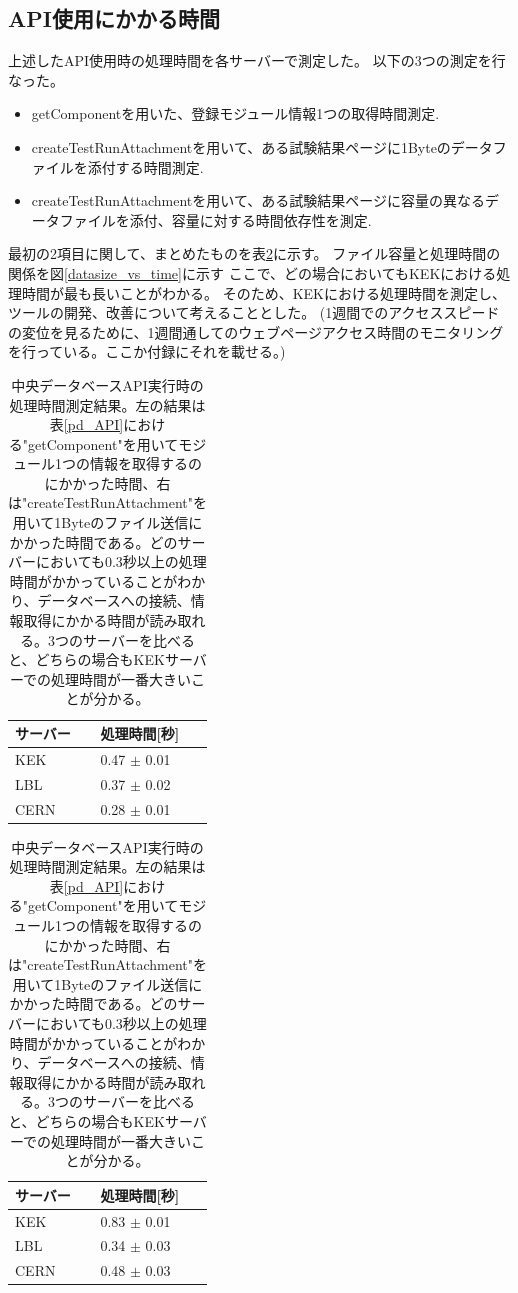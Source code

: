 \subsection{API使用にかかる時間}
上述したAPI使用時の処理時間を各サーバーで測定した。
以下の3つの測定を行なった。
\begin{itemize}
  \item getComponentを用いた、登録モジュール情報1つの取得時間測定.
  \item createTestRunAttachmentを用いて、ある試験結果ページに1Byteのデータファイルを添付する時間測定.
  \item createTestRunAttachmentを用いて、ある試験結果ページに容量の異なるデータファイルを添付、容量に対する時間依存性を測定.
\end{itemize}

最初の2項目に関して、まとめたものを表\ref{use_prodDB_API}に示す。
ファイル容量と処理時間の関係を図\ref{datasize_vs_time}に示す
ここで、どの場合においてもKEKにおける処理時間が最も長いことがわかる。
そのため、KEKにおける処理時間を測定し、ツールの開発、改善について考えることとした。
(1週間でのアクセススピードの変位を見るために、1週間通してのウェブページアクセス時間のモニタリングを行っている。ここか付録にそれを載せる。)

\begin{table}[tbp]
  \caption[中央データベースAPI実行時の処理時間測定結果。]{中央データベースAPI実行時の処理時間測定結果。左の結果は表\ref{pd_API}における"getComponent"を用いてモジュール1つの情報を取得するのにかかった時間、右は"createTestRunAttachment"を用いて1Byteのファイル送信にかかった時間である。どのサーバーにおいても0.3秒以上の処理時間がかかっていることがわかり、データベースへの接続、情報取得にかかる時間が読み取れる。3つのサーバーを比べると、どちらの場合もKEKサーバーでの処理時間が一番大きいことが分かる。}
  \label{use_prodDB_API}
  \begin{minipage}[t]{.45\textwidth}
  \begin{center}
    \begin{tabular}{|ll|} \hline
      サーバー & 処理時間[秒] \\ \hline
      KEK & 0.47 $\pm$ 0.01 \\ 
      LBL & 0.37 $\pm$ 0.02 \\ 
      CERN & 0.28 $\pm$ 0.01 \\ \hline 
    \end{tabular}
  \end{center}
  \end{minipage}
  \hfill 
  \begin{minipage}[t]{.45\textwidth}
  \begin{center}
    \begin{tabular}{|ll|} \hline
      サーバー & 処理時間[秒] \\ \hline
      KEK & 0.83 $\pm$ 0.01 \\ 
      LBL & 0.34 $\pm$ 0.03 \\ 
      CERN & 0.48 $\pm$ 0.03 \\ \hline 
    \end{tabular}
  \end{center}
  \end{minipage}
\end{table}

